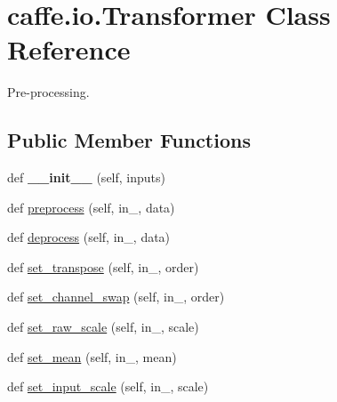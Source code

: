 \hypertarget{classcaffe_1_1io_1_1_transformer}{}\section{caffe.\+io.\+Transformer Class Reference}
\label{classcaffe_1_1io_1_1_transformer}


Pre-\/processing.  


\subsection*{Public Member Functions}
\begin{DoxyCompactItemize}
\item 
\hypertarget{classcaffe_1_1io_1_1_transformer_aad3a0859254dddadbade7e60e624f855}{}def {\bfseries \+\_\+\+\_\+init\+\_\+\+\_\+} (self, inputs)\label{classcaffe_1_1io_1_1_transformer_aad3a0859254dddadbade7e60e624f855}

\item 
def \hyperlink{classcaffe_1_1io_1_1_transformer_a0b2d73743d661b36853fe3d963bd5fbb}{preprocess} (self, in\+\_\+, data)
\item 
def \hyperlink{classcaffe_1_1io_1_1_transformer_a3d048b7f8d255d29c04c2bcce0db318e}{deprocess} (self, in\+\_\+, data)
\item 
def \hyperlink{classcaffe_1_1io_1_1_transformer_af0acba3b0fe23e7fe33228600b18279a}{set\+\_\+transpose} (self, in\+\_\+, order)
\item 
def \hyperlink{classcaffe_1_1io_1_1_transformer_abd32a70aebb66e66de7567800547b114}{set\+\_\+channel\+\_\+swap} (self, in\+\_\+, order)
\item 
def \hyperlink{classcaffe_1_1io_1_1_transformer_aa02e06527de8f0e02d3065bf83b875a9}{set\+\_\+raw\+\_\+scale} (self, in\+\_\+, scale)
\item 
def \hyperlink{classcaffe_1_1io_1_1_transformer_a7064401b3aa295a6ab61895563a60d16}{set\+\_\+mean} (self, in\+\_\+, mean)
\item 
def \hyperlink{classcaffe_1_1io_1_1_transformer_ab3d72541298e2fb73a884df37e56f65c}{set\+\_\+input\+\_\+scale} (self, in\+\_\+, scale)
\end{DoxyCompactItemize}
